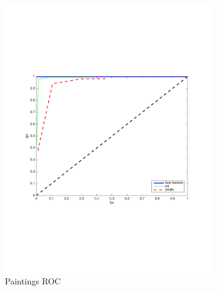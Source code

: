 \documentclass[english,12pt,a4paper,pdftex,elec,utf8, table]{aaltothesis}
\begin{document}
\begin{figure}[htb]
  \begin{center}
  \begin{subfigure}[b]{0.49\textwidth}
    \includegraphics[width=\textwidth]{figures/SaturatecolorsROC.pdf}
    \caption{Paintings ROC}
    \label{Saturateroc}
  \end{subfigure}
  \begin{subfigure}[b]{0.49\textwidth}

\end{subfigure}
\end{center}
\end{figure}
\end{document}
